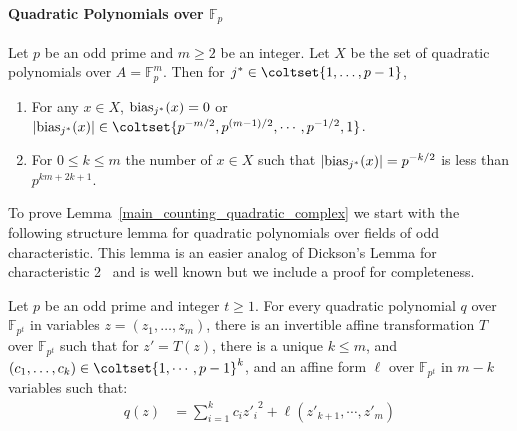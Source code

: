 \paragraph{Quadratic Polynomials over $\mathbb{F}_p$}


\begin{lemma}\label{main_counting_quadratic_complex}
Let $p$ be an odd prime and $m\ge 2$ be an integer.
Let $X$ be the set of quadratic polynomials over $A=\mathbb{F}_p^m$.
Then for $j^*\in \coltset{1,\ldots,p-1}$,
\begin{enumerate}
\item For any $x\in X$,  $\mathrm{bias}_{j^*}(x)=0$ or $|\biasjs(x)|\in \coltset{p^{-m/2},p^{(m-1)/2},\cdots, p^{-1/2},1}$.
\item For $0\le k\le m$ the number of $x\in X$ such that
$|\mathrm{bias}_{j^*}(x)|=p^{-k/2}$ is less than $p^{km+2k+1}$.
\end{enumerate}
\end{lemma}

To prove Lemma~\ref{main_counting_quadratic_complex} we start with the
following structure lemma for quadratic polynomials
over fields of odd characteristic.  This lemma is an easier analog of
Dickson's Lemma for characteristic 2~\cite{dickson:book} and is well
known but we include a proof for completeness.

\begin{lemma}\label{lem:structure-quadratic}
Let $p$ be an odd prime and integer $t\ge 1$.
For every quadratic polynomial $q$ over $\mathbb{F}_{p^t}$ 
in variables $z=(z_1,\ldots, z_m)$,
there is an invertible affine transformation $T$ over $\mathbb{F}_{p^t}$ such
that for $z'=T(z)$,
there is a unique $k\le m$, and $(c_1,\ldots,c_k)\in \coltset{1,\cdots,p-1}^k$,
and an affine form $\ell$ over $\mathbb{F}_{p^t}$ 
in $m-k$ variables such that:
\begin{align*}
q(z)&=\sum_{i=1}^k c_i{z'_i}^2+\ell(z'_{k+1},\cdots,z'_m)
\end{align*}
\end{lemma}

